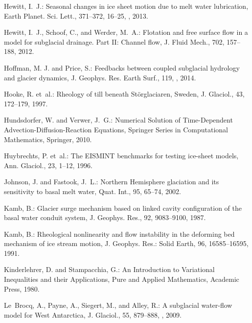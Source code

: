 \documentclass[gmd]{copernicus}   %
\begin{document}
\begin{thebibliography}{68}
Hewitt, I.~J.: Seasonal changes in ice sheet motion due to melt water
  lubrication, Earth Planet. Sci. Lett., 371--372, 16--25,
  , 2013.

Hewitt, I.~J., Schoof, C., and Werder, M.~A.: Flotation and free surface flow
  in a model for subglacial drainage. {P}art {II}: {C}hannel flow, J. Fluid
  Mech., 702, 157--188, 2012.

Hoffman, M. J. and Price, S.: Feedbacks between coupled subglacial hydrology and glacier dynamics, J. Geophys. Res. Earth Surf., 119, , 2014.

Hooke, R. et~al.: Rheology of
  till beneath {S}t\"orglaciaren, {S}weden, J. Glaciol., 43, 172--179, 1997.

Hundsdorfer, W. and Verwer, J.~G.: Numerical {S}olution of {T}ime-{D}ependent
  {A}dvection-{D}iffusion-{R}eaction {E}quations, Springer Series in
  Computational Mathematics, Springer, 2010.

Huybrechts, P. et~al.: The {EISMINT} benchmarks for testing ice-sheet models,
  Ann. Glaciol., 23, 1--12, 1996.

Johnson, J. and Fastook, J.~L.: Northern {H}emisphere glaciation and its
  sensitivity to basal melt water, Quat. Int., 95, 65--74, 2002.

Kamb, B.: Glacier surge mechanism based on linked cavity configuration of the
  basal water conduit system, J. Geophys. Res., 92, 9083--9100, 1987.

Kamb, B.: Rheological nonlinearity and flow instability in the deforming bed
  mechanism of ice stream motion, J. Geophys. Res.: Solid Earth, 96, 16585--16595, 1991.

Kinderlehrer, D. and Stampacchia, G.: An {I}ntroduction to {V}ariational
  {I}nequalities and their {A}pplications, Pure and Applied Mathematics,
  Academic Press, 1980.

Le~Brocq, A., Payne, A., Siegert, M., and Alley, R.: A subglacial water-flow
  model for {W}est {A}ntarctica, J. Glaciol., 55, 879--888,
  , 2009.


\end{thebibliography}
\end{document}
